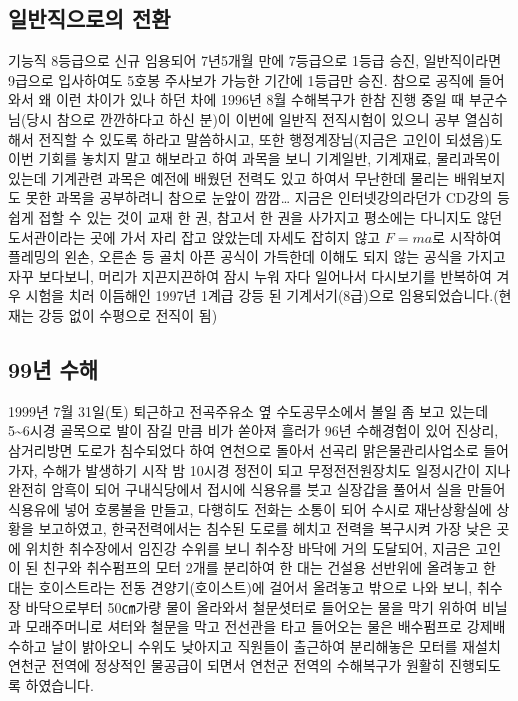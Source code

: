 \documentclass[chapter,book,openany,twoside]{oblivoir}
\begin{document}
\subsection{일반직으로의 전환}

기능직 8등급으로 신규 임용되어 7년5개월 만에 7등급으로 1등급 승진, 일반직이라면 9급으로 입사하여도 5호봉 주사보가 가능한 기간에 1등급만 승진. 참으로 공직에 들어와서 왜 이런 차이가 있나 하던 차에 1996년 8월 수해복구가 한참 진행 중일 때 부군수님(당시 참으로 깐깐하다고 하신 분)이 이번에 일반직 전직시험이 있으니 공부 열심히 해서 전직할 수 있도록 하라고 말씀하시고, 또한 행정계장님(지금은 고인이 되셨음)도 이번 기회를 놓치지 말고 해보라고 하여 과목을 보니 기계일반, 기계재료, 물리과목이 있는데 기계관련 과목은 예전에 배웠던 전력도 있고 하여서 무난한데 물리는 배워보지도 못한 과목을 공부하려니 참으로 눈앞이 깜깜… 지금은 인터넷강의라던가 CD강의 등 쉽게 접할 수 있는 것이 교재 한 권, 참고서 한 권을 사가지고 평소에는 다니지도 않던 도서관이라는 곳에 가서 자리 잡고 앉았는데 자세도 잡히지 않고 $F=ma$로 시작하여 플레밍의 왼손, 오른손 등 골치 아픈 공식이 가득한데 이해도 되지 않는 공식을 가지고 자꾸 보다보니, 머리가 지끈지끈하여 잠시 누워 자다 일어나서 다시보기를 반복하여 겨우 시험을 치러 이듬해인 1997년 1계급 강등 된 기계서기(8급)으로 임용되었습니다.(현재는 강등 없이 수평으로 전직이 됨)
\subsection{99년 수해}
1999년 7월 31일(토) 퇴근하고 전곡주유소 옆 수도공무소에서 볼일 좀 보고 있는데 5\textasciitilde6시경 골목으로 발이 잠길 만큼 비가 쏟아져 흘러가 96년 수해경험이 있어 진상리, 삼거리방면 도로가 침수되었다 하여 연천으로 돌아서 선곡리 맑은물관리사업소로 들어가자, 수해가 발생하기 시작 밤 10시경 정전이 되고 무정전전원장치도 일정시간이 지나 완전히 암흑이 되어 구내식당에서 접시에 식용유를 붓고 실장갑을 풀어서 실을 만들어 식용유에 넣어 호롱불을 만들고, 다행히도 전화는 소통이 되어 수시로 재난상황실에 상황을 보고하였고, 한국전력에서는 침수된 도로를 헤치고 전력을 복구시켜 가장 낮은 곳에 위치한 취수장에서 임진강 수위를 보니 취수장 바닥에 거의 도달되어, 지금은 고인이 된 친구와 취수펌프의 모터 2개를 분리하여 한 대는 건설용 선반위에 올려놓고 한 대는 호이스트라는 전동 견양기(호이스트)에 걸어서 올려놓고 밖으로 나와 보니, 취수장 바닥으로부터 50㎝가량 물이 올라와서 철문셧터로 들어오는 물을 막기 위하여 비닐과 모래주머니로 셔터와 철문을 막고 전선관을 타고 들어오는 물은 배수펌프로 강제배수하고 날이 밝아오니 수위도 낮아지고 직원들이 출근하여 분리해놓은 모터를 재설치 연천군 전역에 정상적인 물공급이 되면서 연천군 전역의 수해복구가 원활히 진행되도록 하였습니다. 
\end{document}
